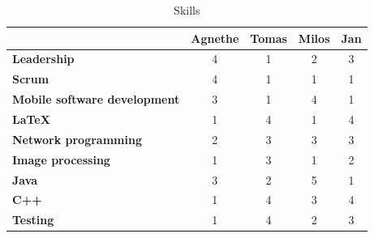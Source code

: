 \documentclass{article}
\newcommand{\ra}[1]{\renewcommand{\arraystretch}{#1}}
\begin{document}
\begin{table}\centering \ra{1.3}
    \caption{Skills}
    \label{tab:skills}
    \vspace{2mm}
    \begin{tabular}{lcccc}
    \toprule
                                & Agnethe   & Tomas & Milos & Jan \\
    \midrule
    \textbf{Leadership                 } & 4         & 1     & 2     & 3     \\ 
    \textbf{Scrum                      } & 4         & 1     & 1     & 1     \\ 
    \textbf{Mobile software development} & 3         & 1     & 4     & 1     \\ 
    \textbf{\LaTeX                     } & 1         & 4     & 1     & 4     \\ 
    \textbf{Network programming        } & 2         & 3     & 3     & 3     \\ 
    \textbf{Image processing           } & 1         & 3     & 1     & 2     \\ 
    \textbf{Java                       } & 3         & 2     & 5     & 1     \\ 
    \textbf{C++                        } & 1         & 4     & 3     & 4     \\ 
    \textbf{Testing                    } & 1         & 4     & 2     & 3     \\
    \bottomrule
    \end{tabular}
\end{table}
\end{document}
